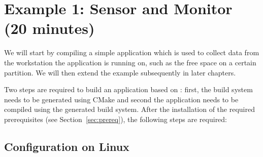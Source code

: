 %
% 
%
%
%

\section{Example 1: Sensor and Monitor (20 minutes)}
\label{sec:example_sensorMonitor}

We will start by compiling a simple application which is used to collect data from the workstation the application is running on,
such as the free space on a certain partition.
We will then extend the example subsequently in later chapters.

Two steps are required to build an application based on \xme:
first, the build system needs to be generated using CMake
and second the application needs to be compiled using the generated build system.
%
After the installation of the required prerequisites (see Section~\ref{sec:prereq}), the following steps are required:

\subsection{Configuration on Linux}
\label{sec:example_sensorMonitor:linux}

